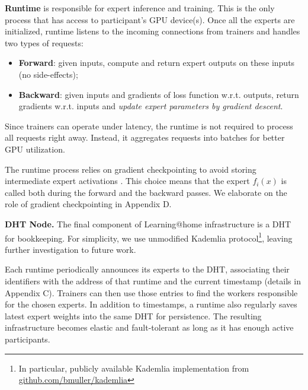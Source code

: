 \textbf{Runtime} is responsible for expert inference and training. This is the only process that has access to participant's GPU device(s). Once all the experts are initialized, runtime listens to the incoming connections from trainers and handles two types of requests:
\vspace{-4px}
\begin{itemize}[leftmargin=*]
    \item \textbf{Forward}: given inputs, compute and return expert outputs on these inputs (no side-effects);
    \item \textbf{Backward}: given inputs and gradients of loss function w.r.t. outputs, return gradients w.r.t. inputs and \textit{update expert parameters by gradient descent}.
\end{itemize}
\vspace{-4px}

Since trainers can operate under latency, the runtime is not required to process all requests right away. Instead, it aggregates requests into batches for better GPU utilization.

\vspace{-1px}

The runtime process relies on gradient checkpointing to avoid storing intermediate expert activations \cite{gradient_checkpointing_autograd,gradient_checkpointing_dl}.
This choice means that the expert $f_i(x)$ is called both during the forward and the backward passes.
We elaborate on the role of gradient checkpointing in Appendix D.

\vspace{-1px}

\textbf{DHT Node.} The final component of Learning@home infrastructure is a DHT for bookkeeping. For simplicity, we use unmodified Kademlia protocol\footnote{In particular, publicly available Kademlia implementation from \url{github.com/bmuller/kademlia}}, leaving further investigation to future work.

\vspace{-1px}

Each runtime periodically announces its experts to the DHT, associating their identifiers with the address of that runtime and the current timestamp (details in Appendix C). Trainers can then use those entries to find the workers responsible for the chosen experts. In addition to timestamps, a runtime also regularly saves latest expert weights into the same DHT for persistence. The resulting infrastructure becomes elastic and fault-tolerant as long as it has enough active participants.




